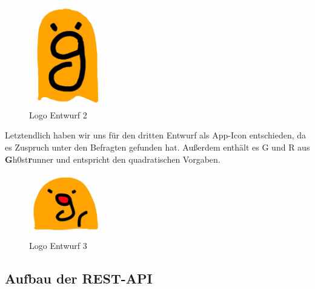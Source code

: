 \begin{figure}[!h]
\centering
\includegraphics[width=0.3\textwidth]{abb/icon_entwurf2}
\caption{Logo Entwurf 2}
\end{figure}
Letztendlich haben wir uns für den dritten Entwurf als App-Icon entschieden, da es Zuspruch unter den Befragten gefunden hat. Außerdem enthält es G und R aus \textbf{G}h0st\textbf{r}unner und entspricht den quadratischen Vorgaben.
\begin{figure}[!h]
\centering
\includegraphics[width=0.3\textwidth]{abb/icon_entwurf3}
\caption{Logo Entwurf 3}
\end{figure}

\subsection{Aufbau der REST-API}
